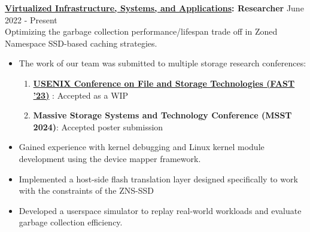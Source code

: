 \textbf{
    \href{http://visa.lab.asu.edu/}{Virtualized Infrastructure, Systems, and Applications}: Researcher
} \hfill June 2022 - Present\\
Optimizing the garbage collection performance/lifespan trade off in Zoned Namespace SSD-based caching strategies.
\begin{itemize}
    \item{The work of our team was submitted to multiple storage research conferences:}
    \begin{enumerate}
        \item \textbf{
                \href{https://www.usenix.org/conference/fast23/wips}{USENIX Conference on File and Storage Technologies (FAST '23)}
            }: Accepted as a WIP
        \item \textbf{Massive Storage Systems and Technology Conference (MSST 2024)}: Accepted poster submission
    \end{enumerate}
    \item{Gained experience with kernel debugging and Linux kernel module development using the device mapper framework.}
    \item{Implemented a host-side flash translation layer designed specifically to work with the constraints of the ZNS-SSD}
    \item{Developed a userspace simulator to replay real-world workloads and evaluate garbage collection efficiency.}
\end{itemize}
